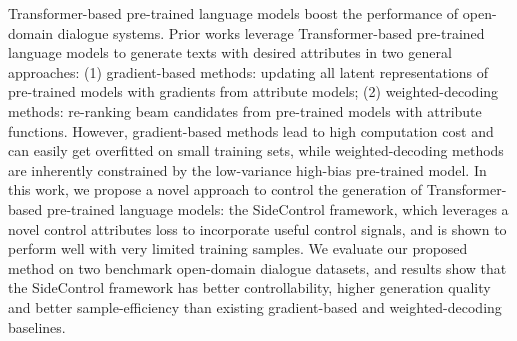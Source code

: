 Transformer-based pre-trained language models boost the performance of open-domain dialogue systems. Prior works leverage Transformer-based pre-trained language models to generate texts with desired attributes in two general approaches: (1) gradient-based methods: updating all latent representations of pre-trained models with gradients from attribute models; (2) weighted-decoding methods: re-ranking beam candidates from pre-trained models with attribute functions. However, gradient-based methods lead to high computation cost and can easily get overfitted on small training sets, while weighted-decoding methods are inherently constrained by the low-variance high-bias pre-trained model. In this work, we propose a novel approach to control the generation of Transformer-based pre-trained language models: the SideControl framework, which leverages a novel control attributes loss to incorporate useful control signals, and is shown to perform well with very limited training samples. We evaluate our proposed method on two benchmark open-domain dialogue datasets, and results show that the SideControl framework has better controllability, higher generation quality and better sample-efficiency than existing gradient-based and weighted-decoding baselines.

